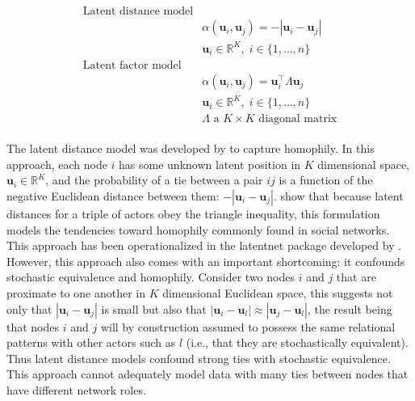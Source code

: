 \documentclass[11pt,pdflatex]{elsarticle}
\newcommand{\pkg}[1]{{\fontseries{b}\selectfont #1}}
\begin{document}
\begin{align}
\begin{aligned}
\text{Latent distance model} \\
	&\alpha(\textbf{u}_{i}, \textbf{u}_{j}) = -|\textbf{u}_{i} - \textbf{u}_{j}| \\
	&\textbf{u}_{i} \in \mathbb{R}^{K}, \; i \in \{1, \ldots, n \} \\
\text{Latent factor model} \\
	&\alpha(\textbf{u}_{i}, \textbf{u}_{j}) = \textbf{u}_{i}^{\top} \Lambda \textbf{u}_{j} \\
	&\textbf{u}_{i} \in \mathbb{R}^{K}, \; i \in \{1, \ldots, n \} \\
	&\Lambda \text{ a } K \times K \text{ diagonal matrix}
\label{eqn:latAlpha}
\end{aligned}
\end{align}

The latent distance model was developed by \citet{hoff:etal:2002} to capture homophily. In this approach, each node $i$ has some unknown latent position in $K$ dimensional space, $\textbf{u}_{i} \in \mathbb{R}^{K}$, and the probability of a tie between a pair $ij$ is a function of the negative Euclidean distance between them: $-|\textbf{u}_{i} - \textbf{u}_{j}|$. \citet{hoff:etal:2002} show that because latent distances for a triple of actors obey the triangle inequality, this formulation models the tendencies toward homophily commonly found in social networks. This approach has been operationalized in the \pkg{latentnet} package developed by \citet{krivitsky:handcock:2015}. However, this approach also comes with an important shortcoming: it confounds stochastic equivalence and homophily. Consider two nodes $i$ and $j$ that are proximate to one another in $K$ dimensional Euclidean space, this suggests not only that $|\textbf{u}_{i} - \textbf{u}_{j}|$ is small but also that $|\textbf{u}_{i} - \textbf{u}_{l}| \approx |\textbf{u}_{j} - \textbf{u}_{l}|$, the result being that nodes $i$ and $j$ will by construction assumed to possess the same relational patterns with other actors such as $l$ (i.e., that they are stochastically equivalent). Thus latent distance models confound strong ties with stochastic equivalence. This approach cannot adequately model data with many ties between nodes that have different network roles. 
\end{document}
